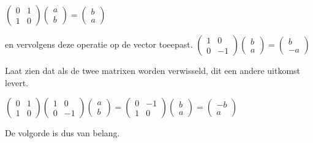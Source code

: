 \documentclass[../../main.tex]{subfiles}
\begin{document}
$
\begin{pmatrix}
0&1\\
1&0
\end{pmatrix}
\begin{pmatrix}
a\\
b
\end{pmatrix}
=
\begin{pmatrix}
b\\
a
\end{pmatrix}
$

en vervolgens deze operatie op de vector toeepast.
$
\begin{pmatrix}
1&0\\
0&-1
\end{pmatrix}
\begin{pmatrix}
b\\
a
\end{pmatrix}
=
\begin{pmatrix}
b\\
-a
\end{pmatrix}
$



\fun Laat zien dat als de twee matrixen worden verwisseld, dit een andere uitkomst levert.

$
\begin{pmatrix}
0&1\\
1&0
\end{pmatrix}
\begin{pmatrix}
1&0\\
0&-1
\end{pmatrix}
\begin{pmatrix}
a\\
b
\end{pmatrix}
=
\begin{pmatrix}
0&-1\\
1&0
\end{pmatrix}
\begin{pmatrix}
b\\
a
\end{pmatrix}
=
\begin{pmatrix}
-b\\
a
\end{pmatrix}
$

De volgorde is dus van belang.
\\
\end{document}

